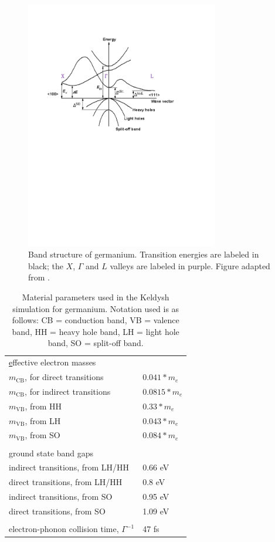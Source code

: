 \begin{figure}
	\centering
	\includegraphics[width=0.75\textwidth]{figures/chap4/Ge_band_structure.pdf}
	\caption{Band structure of germanium. Transition energies are labeled in black; the $X$, $\Gamma$ and $L$ valleys are labeled in purple. Figure adapted from \cite{NSMArchivePhysical}.}
	\label{fig:Ge_band_structure}
\end{figure}


\begin{table}[]
	\centering
	\begin{tabular}{ll}
		{\ul effective electron masses} &  \\
		$m_{\textrm{CB}}$, for direct transitions & $0.041 * m_e$ \\
		$m_{\textrm{CB}}$, for indirect transitions & $0.0815 * m_e$ \\
		$m_{\textrm{VB}}$, from HH & $0.33 * m_e$ \\
		$m_{\textrm{VB}}$, from LH & $0.043 * m_e$ \\
		$m_{\textrm{VB}}$, from SO & $0.084 * m_e$ \\
		&  \\
		{\ul ground state band gaps} &  \\
		indirect transitions,  from LH/HH & 0.66 eV \\
		direct transitions, from LH/HH & 0.8 eV \\
		indirect transitions, from SO & 0.95 eV \\
		direct transitions,  from SO & 1.09 eV \\
		&  \\
		electron-phonon collision time, $\Gamma^{-1}$ & 47 fs
	\end{tabular}
	\caption{Material parameters used in the Keldysh simulation for germanium. Notation used is as follows: CB = conduction band, VB = valence band, HH = heavy hole band, LH = light hole band, SO = split-off band.}
	\label{tab:Keldysh_parameters}
\end{table}

